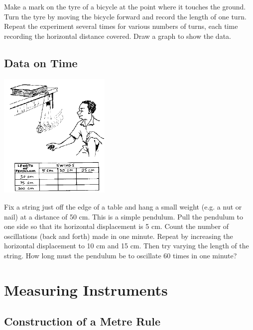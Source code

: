 \begin{multicols}{2}
Make a mark on the tyre of a bicycle at the point where it touches the ground. Turn the tyre by moving the bicycle forward and record the length of one turn. Repeat the experiment several times for various numbers of turns, each time recording the horizontal distance covered. Draw a graph to show the data.

\subsection{Data on Time}

\begin{center}
\includegraphics[width=0.4\textwidth]{./img/source/meas-time.png}
\end{center}

Fix a string just off the edge of a table and hang a small weight (e.g. a nut or nail) at a distance of 50 cm. This is a simple pendulum. Pull the pendulum to one side so that its horizontal displacement is 5 cm. Count the number of oscillations (back and forth) made in one minute. Repeat by increasing the horizontal displacement to 10 cm and 15 cm. Then try varying the length of the string. How long must the pendulum be to oscillate 60 times in one minute?



\section*{Measuring Instruments}


\subsection{Construction of a Metre Rule}
\label{sub:metrerule}


\end{multicols}
